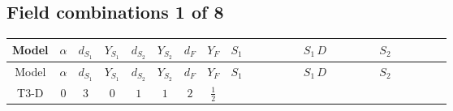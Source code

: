 \documentclass[8pt]{article}
\begin{document}
\begin{landscape}
\subsection*{Field combinations 1 of 8}
\begin{longtable}{@{}cccccccc >{\raggedright\arraybackslash}p{0.21\linewidth} >{\raggedright\arraybackslash}p{0.21\linewidth} >{\raggedright\arraybackslash}p{0.21\linewidth}@{}}
\toprule
Model & $\alpha$ & $d_{S_1}$ & $Y_{S_1}$ & $d_{S_2}$ & $Y_{S_2}$ & $d_F$ & $Y_F$ & $S_1$ & $S_1\,D$ & $S_2$ \\
\midrule
\endfirsthead
\toprule
Model & $\alpha$ & $d_{S_1}$ & $Y_{S_1}$ & $d_{S_2}$ & $Y_{S_2}$ & $d_F$ & $Y_F$ & $S_1$ & $S_1\,D$ & $S_2$ \\
\midrule
\endhead
T3-D & $0$ & $3$ & $0$ & $1$ & $1$ & $2$ & $\frac{1}{2}$ & \scriptsize\adjustbox{max width=\linewidth}{$\begin{gathered} +\frac{2 \hbar  \overline{y_{1,i_1,r_1}} \overline{y_{1,i_2,r_2}} S_{1,j_2}^2 y_{1,i_1,r_2} y_{1,i_2,r_1} \left(S_{1,j_1}{}^{\dagger }\right){}^2}{3 \epsilon } \\ -C_{S_1^\dagger S_1} S_{1,j_1} S_{1,j_1}{}^{\dagger } \\ +\frac{C_{S_1^\dagger S_1} \hbar  \overline{y_{1,i_1,r_1}} S_{1,j_1} y_{1,i_1,r_1} S_{1,j_1}{}^{\dagger }}{\sqrt{3}}\end{gathered}$} & \scriptsize\adjustbox{max width=\linewidth}{$\begin{gathered} +D_{\mu _1}\left(S_{1,j_1}\right){}^{\dagger } D_{\mu _1}\left(S_{1,j_1}\right)\end{gathered}$} & \scriptsize\adjustbox{max width=\linewidth}{$\begin{gathered} -\frac{2 \hbar  \overline{y_{2,i_1,r_1}} \overline{y_{2,i_2,r_2}} S_2^2 y_{2,i_1,r_2} y_{2,i_2,r_1} \left(S_2{}^{\dagger }\right){}^2}{\epsilon } \\ -C_{S_2^\dagger S_2} S_2 S_2{}^{\dagger } \\ +C_{S_2^\dagger S_2} \hbar  \overline{y_{2,i_1,r_1}} S_2 y_{2,i_1,r_1} S_2{}^{\dagger }\end{gathered}$} \\

\end{longtable}
\end{landscape}
\end{document}
